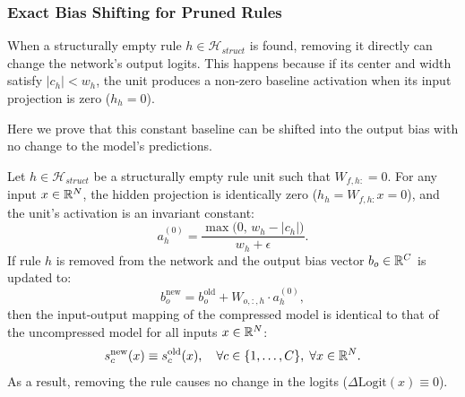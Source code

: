 \subsubsection{Exact Bias Shifting for Pruned Rules}
\label{subsec:bias_shifting}

When a structurally empty rule $h \in \mathcal{H}_{struct}$ is found, removing it directly can change the network's output logits. This happens because if its center and width satisfy $|c_h| < w_h$, the unit produces a non-zero baseline activation when its input projection is zero ($h_h = 0$). 

Here we prove that this constant baseline can be shifted into the output bias with no change to the model's predictions.

\begin{proposition}
\label{prop:bias_shifting}
Let $h \in \mathcal{H}_{struct}$ be a structurally empty rule unit such that $W_{f,h:} = 0$. For any input $x \in \mathbb{R}^N$, the hidden projection is identically zero ($h_h = W_{f,h:} x = 0$), and the unit's activation is an invariant constant:
\begin{equation}
\label{eq:baseline_activation}
a_h^{(0)} = \frac{\max\Big(0, \, w_h - |c_h|\Big)}{w_h + \epsilon}.
\end{equation}
If rule $h$ is removed from the network and the output bias vector $b_o \in \mathbb{R}^C$ is updated to:
\begin{equation}
\label{eq:bias_update}
b_o^{\text{new}} = b_o^{\text{old}} + W_{o,:,h} \cdot a_h^{(0)},
\end{equation}
then the input-output mapping of the compressed model is identical to that of the uncompressed model for all inputs $x \in \mathbb{R}^N$:
\begin{equation}
s_c^{\text{new}}(x) \equiv s_c^{\text{old}}(x), \quad \forall c \in \{1, \dots, C\}, \; \forall x \in \mathbb{R}^N.
\end{equation}
As a result, removing the rule causes no change in the logits ($\Delta \text{Logit}(x) \equiv 0$).
\end{proposition}

